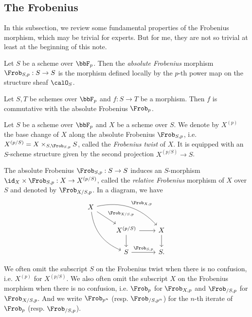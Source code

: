 \subsection{The Frobenius}

In this subsection, we review some fundamental properties of the Frobenius morphism, which may be trivial for experts.
But for me, they are not so trivial at least at the beginning of this note.

\begin{definition}
	Let $S$ be a scheme over $\bbF_p$.
	Then the \emph{absolute Frobenius} morphism $\Frob_{S,p}: S \to S$ is the morphism defined locally by the $p$-th power map on the structure sheaf $\calO_S$.
\end{definition}

\begin{proposition}
	Let $S,T$ be schemes over $\bbF_p$ and $f: S \to T$ be a morphism.
	Then $f$ is commutative with the absolute Frobenius $\Frob_p$.
\end{proposition}

\begin{definition}
	Let $S$ be a scheme over $\bbF_p$ and $X$ be a scheme over $S$.
	We denote by $X^{(p)}$ the base change of $X$ along the absolute Frobenius $\Frob_{S,p}$, i.e. $X^{(p/S)} = X \times_{S, \Frob_{S,p}} S$, called the \emph{Frobenius twist} of $X$.
	It is equipped with an $S$-scheme structure given by the second projection $X^{(p/S)} \to S$.

	The absolute Frobenius $\Frob_{S,p}: S \to S$ induces an $S$-morphism $\id_X \times \Frob_{S,p}: X \to X^{(p/S)}$, called the \emph{relative Frobenius} morphism of $X$ over $S$ and denoted by $\Frob_{X/S, p}$.
	In a diagram, we have
	\[ \begin{tikzcd}
			X \arrow[rrd, bend left, "\Frob_{X,p}"] \arrow[rdd, bend right] \arrow[rd, "\Frob_{X/S,p}"] & & \\
			& X^{(p/S)} \arrow[r] \arrow[d] & X \arrow[d] \\
			& S \arrow[r, "\Frob_{S,p}"] & S.
		\end{tikzcd} \]
\end{definition}
\begin{remark}
	We often omit the subscript $S$ on the Frobenius twist when there is no confusion, i.e. $X^{(p)}$ for $X^{(p/S)}$.
	We also often omit the subscript $X$ on the Frobenius morphism when there is no confusion, i.e. $\Frob_p$ for $\Frob_{X,p}$ and $\Frob_{/S,p}$ for $\Frob_{X/S,p}$.
	And we write $\Frob_{p^n}$ (resp. $\Frob_{/S,p^n}$) for the $n$-th iterate of $\Frob_p$ (resp. $\Frob_{/S,p}$).
\end{remark}

